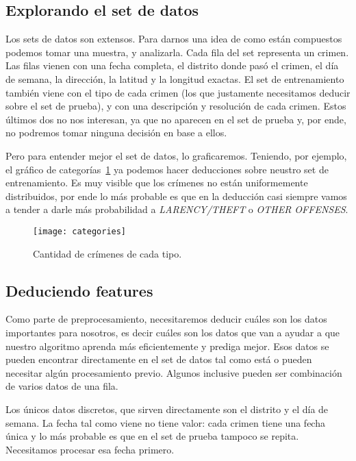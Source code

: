 \subsection{Explorando el set de datos} %
\label{sub:explorando_el_set_de_datos}

Los sets de datos son extensos. Para darnos una idea de como están compuestos podemos tomar una muestra, y analizarla. Cada fila del set representa un crimen. Las filas vienen con una fecha completa, el distrito donde pasó el crimen, el día de semana, la dirección, la latitud y la longitud exactas. El set de entrenamiento también viene con el tipo de cada crimen (los que justamente necesitamos deducir sobre el set de prueba), y con una descripción y resolución de cada crimen. Estos últimos dos no nos interesan, ya que no aparecen en el set de prueba y, por ende, no podremos tomar ninguna decisión en base a ellos.

Pero para entender mejor el set de datos, lo graficaremos. Teniendo, por ejemplo, el gráfico de categorías~\ref{fig:categories} ya podemos hacer deducciones sobre neustro set de entrenamiento. Es muy visible que los crímenes no están uniformemente distribuidos, por ende lo más probable es que en la deducción casi siempre vamos a tender a darle más probabilidad a \textit{LARENCY/THEFT} o \textit{OTHER OFFENSES}.

\begin{figure}[H]
\texttt{[image: categories]}
\caption{Cantidad de crímenes de cada tipo.}
\label{fig:categories}
\end{figure}


\subsection{Deduciendo features} %
\label{sub:deduciendo_features}

Como parte de preprocesamiento, necesitaremos deducir cuáles son los datos importantes para nosotros, es decir cuáles son los datos que van a ayudar a que nuestro algoritmo aprenda más eficientemente y prediga mejor. Esos datos se pueden encontrar directamente en el set de datos tal como está o pueden necesitar algún procesamiento previo. Algunos inclusive pueden ser combinación de varios datos de una fila.

Los únicos datos discretos, que sirven directamente son el distrito y el día de semana. La fecha tal como viene no tiene valor: cada crimen tiene una fecha única y lo más probable es que en el set de prueba tampoco se repita. Necesitamos procesar esa fecha primero.

